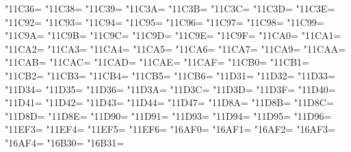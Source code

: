 \XeTeXcharclass"11C36=\KclassCM
\XeTeXcharclass"11C38=\KclassCM
\XeTeXcharclass"11C39=\KclassCM
\XeTeXcharclass"11C3A=\KclassCM
\XeTeXcharclass"11C3B=\KclassCM
\XeTeXcharclass"11C3C=\KclassCM
\XeTeXcharclass"11C3D=\KclassCM
\XeTeXcharclass"11C3E=\KclassCM
\XeTeXcharclass"11C92=\KclassCM
\XeTeXcharclass"11C93=\KclassCM
\XeTeXcharclass"11C94=\KclassCM
\XeTeXcharclass"11C95=\KclassCM
\XeTeXcharclass"11C96=\KclassCM
\XeTeXcharclass"11C97=\KclassCM
\XeTeXcharclass"11C98=\KclassCM
\XeTeXcharclass"11C99=\KclassCM
\XeTeXcharclass"11C9A=\KclassCM
\XeTeXcharclass"11C9B=\KclassCM
\XeTeXcharclass"11C9C=\KclassCM
\XeTeXcharclass"11C9D=\KclassCM
\XeTeXcharclass"11C9E=\KclassCM
\XeTeXcharclass"11C9F=\KclassCM
\XeTeXcharclass"11CA0=\KclassCM
\XeTeXcharclass"11CA1=\KclassCM
\XeTeXcharclass"11CA2=\KclassCM
\XeTeXcharclass"11CA3=\KclassCM
\XeTeXcharclass"11CA4=\KclassCM
\XeTeXcharclass"11CA5=\KclassCM
\XeTeXcharclass"11CA6=\KclassCM
\XeTeXcharclass"11CA7=\KclassCM
\XeTeXcharclass"11CA9=\KclassCM
\XeTeXcharclass"11CAA=\KclassCM
\XeTeXcharclass"11CAB=\KclassCM
\XeTeXcharclass"11CAC=\KclassCM
\XeTeXcharclass"11CAD=\KclassCM
\XeTeXcharclass"11CAE=\KclassCM
\XeTeXcharclass"11CAF=\KclassCM
\XeTeXcharclass"11CB0=\KclassCM
\XeTeXcharclass"11CB1=\KclassCM
\XeTeXcharclass"11CB2=\KclassCM
\XeTeXcharclass"11CB3=\KclassCM
\XeTeXcharclass"11CB4=\KclassCM
\XeTeXcharclass"11CB5=\KclassCM
\XeTeXcharclass"11CB6=\KclassCM
\XeTeXcharclass"11D31=\KclassCM
\XeTeXcharclass"11D32=\KclassCM
\XeTeXcharclass"11D33=\KclassCM
\XeTeXcharclass"11D34=\KclassCM
\XeTeXcharclass"11D35=\KclassCM
\XeTeXcharclass"11D36=\KclassCM
\XeTeXcharclass"11D3A=\KclassCM
\XeTeXcharclass"11D3C=\KclassCM
\XeTeXcharclass"11D3D=\KclassCM
\XeTeXcharclass"11D3F=\KclassCM
\XeTeXcharclass"11D40=\KclassCM
\XeTeXcharclass"11D41=\KclassCM
\XeTeXcharclass"11D42=\KclassCM
\XeTeXcharclass"11D43=\KclassCM
\XeTeXcharclass"11D44=\KclassCM
\XeTeXcharclass"11D47=\KclassCM
\XeTeXcharclass"11D8A=\KclassCM
\XeTeXcharclass"11D8B=\KclassCM
\XeTeXcharclass"11D8C=\KclassCM
\XeTeXcharclass"11D8D=\KclassCM
\XeTeXcharclass"11D8E=\KclassCM
\XeTeXcharclass"11D90=\KclassCM
\XeTeXcharclass"11D91=\KclassCM
\XeTeXcharclass"11D93=\KclassCM
\XeTeXcharclass"11D94=\KclassCM
\XeTeXcharclass"11D95=\KclassCM
\XeTeXcharclass"11D96=\KclassCM
\XeTeXcharclass"11EF3=\KclassCM
\XeTeXcharclass"11EF4=\KclassCM
\XeTeXcharclass"11EF5=\KclassCM
\XeTeXcharclass"11EF6=\KclassCM
\XeTeXcharclass"16AF0=\KclassCM
\XeTeXcharclass"16AF1=\KclassCM
\XeTeXcharclass"16AF2=\KclassCM
\XeTeXcharclass"16AF3=\KclassCM
\XeTeXcharclass"16AF4=\KclassCM
\XeTeXcharclass"16B30=\KclassCM
\XeTeXcharclass"16B31=\KclassCM
